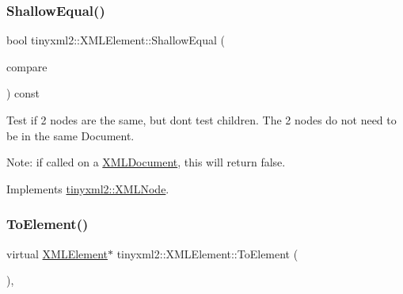 \mbox{\label{classtinyxml2_1_1_x_m_l_element_a61ffd7bf918a9db4aa6203d855ac5ec2}} 
\subsubsection{\texorpdfstring{Shallow\+Equal()}{ShallowEqual()}}
{\footnotesize\ttfamily bool tinyxml2\+::\+X\+M\+L\+Element\+::\+Shallow\+Equal (\begin{DoxyParamCaption}\item[{const \mbox{\hyperlink{classtinyxml2_1_1_x_m_l_node}{X\+M\+L\+Node}} $\ast$}]{compare }\end{DoxyParamCaption}) const\hspace{0.3cm}{\ttfamily [virtual]}}

Test if 2 nodes are the same, but don\textquotesingle{}t test children. The 2 nodes do not need to be in the same Document.

Note\+: if called on a \mbox{\hyperlink{classtinyxml2_1_1_x_m_l_document}{X\+M\+L\+Document}}, this will return false. 

Implements \mbox{\hyperlink{classtinyxml2_1_1_x_m_l_node_a7ce18b751c3ea09eac292dca264f9226}{tinyxml2\+::\+X\+M\+L\+Node}}.

\mbox{\label{classtinyxml2_1_1_x_m_l_element_ad9ff5c2dbc15df36cf664ce1b0ea0a5d}} 
\subsubsection{\texorpdfstring{To\+Element()}{ToElement()}\hspace{0.1cm}{\footnotesize\ttfamily [1/2]}}
{\footnotesize\ttfamily virtual \mbox{\hyperlink{classtinyxml2_1_1_x_m_l_element}{X\+M\+L\+Element}}$\ast$ tinyxml2\+::\+X\+M\+L\+Element\+::\+To\+Element (\begin{DoxyParamCaption}{ }\end{DoxyParamCaption})\hspace{0.3cm}{\ttfamily [inline]}, {\ttfamily [virtual]}}



